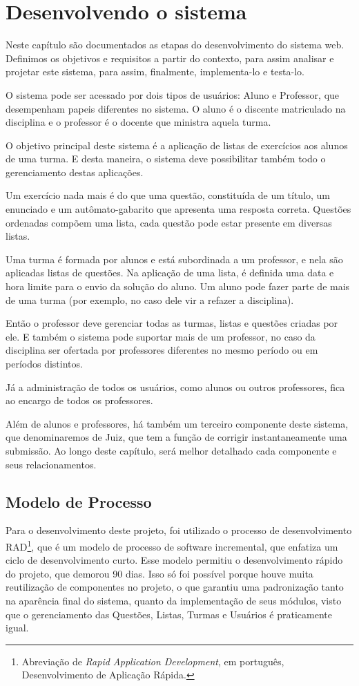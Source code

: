 \documentclass[
	12pt,				%
	openany,
	oneside,
	a4paper,			%
	english,			%
	brazil				%
	]{abntex2}
\begin{document}
\chapter[Desenvolvendo o sistema] {Desenvolvendo o sistema}
  Neste capítulo são documentados as etapas do desenvolvimento do sistema web. Definimos os objetivos e requisitos a partir do contexto, para assim analisar e projetar este sistema, para assim, finalmente, implementa-lo e testa-lo. 

  O sistema pode ser acessado por dois tipos de usuários: Aluno e Professor, que desempenham papeis diferentes no sistema. O aluno é o discente matriculado na disciplina e o professor é o docente que ministra aquela turma.

  O objetivo principal deste sistema é a aplicação de listas de exercícios aos alunos de uma turma. E desta maneira, o sistema deve possibilitar também todo o gerenciamento destas aplicações.

  Um exercício nada mais é do que uma questão, constituída de um título, um enunciado e um autômato-gabarito que apresenta uma resposta correta. Questões ordenadas compõem uma lista, cada questão pode estar presente em diversas listas.

  Uma turma é formada por alunos e está subordinada a um professor, e nela são aplicadas listas de questões. Na aplicação de uma lista, é definida uma data e hora limite para o envio da solução do aluno. Um aluno pode fazer parte de mais de uma turma (por exemplo, no caso dele vir a refazer a disciplina).

  Então o professor deve gerenciar todas as turmas, listas e questões criadas por ele. E também o sistema pode suportar mais de um professor, no caso da disciplina ser ofertada por professores diferentes no mesmo período ou em períodos distintos.

  Já a administração de todos os usuários, como alunos ou outros professores, fica ao encargo de todos os professores. %


  Além de alunos e professores, há também um terceiro componente deste sistema, que denominaremos de Juiz, que tem a função de corrigir instantaneamente uma submissão. Ao longo deste capítulo, será melhor detalhado cada componente e seus relacionamentos.


\section{Modelo de Processo}
  Para o desenvolvimento deste projeto, foi utilizado o processo de desenvolvimento RAD\footnote{Abreviação de \textit{Rapid Application Development}, em português, Desenvolvimento de Aplicação Rápida.}, que é um modelo de processo de software incremental, que enfatiza um ciclo de desenvolvimento curto. Esse modelo permitiu o desenvolvimento rápido do projeto, que demorou 90 dias. Isso só foi possível porque houve muita reutilização de componentes no projeto, o que garantiu uma padronização tanto na aparência final do sistema, quanto da implementação de seus módulos, visto que o gerenciamento das Questões, Listas, Turmas e Usuários é praticamente igual.
\end{document}
